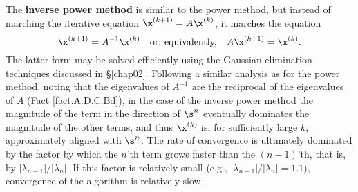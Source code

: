 The {\bf inverse power method} is similar to the power method, but instead of marching the iterative equation $\x^{(k+1)}=A\x^{(k)}$, it marches the equation
\begin{equation}
\x^{(k+1)}=A^{-1}\x^{(k)} \quad \textrm{or, equivalently,} \quad A\x^{(k+1)}=\x^{(k)}.\label{eq.inversepowermethod}
\end{equation}
The latter form may be solved efficiently using the Gaussian elimination techniques discussed in \S \ref{chap02}.
Following a similar analysis as for the power method,
noting that the eigenvalues of $A^{-1}$ are the reciprocal of the eigenvalues of $A$ (Fact \ref{fact.A.D.C.Bd}),
in the case of the inverse power method the magnitude of the term in the direction of $\s^n$
eventually dominates the magnitude of the other terms, and thus $\x^{(k)}$ is, for sufficiently large $k$, approximately aligned with $\s^n$.
The rate of convergence is ultimately dominated by the factor by which the 
$n$'th term grows faster than the $(n-1)$'th, that is, by $|\lambda_{n-1}|/|\lambda_{n}|$.
If this factor is relatively small (e.g., $|\lambda_{n-1}|/|\lambda_{n}|=1.1$), convergence of the algorithm is relatively slow.
\vskip0.1in

